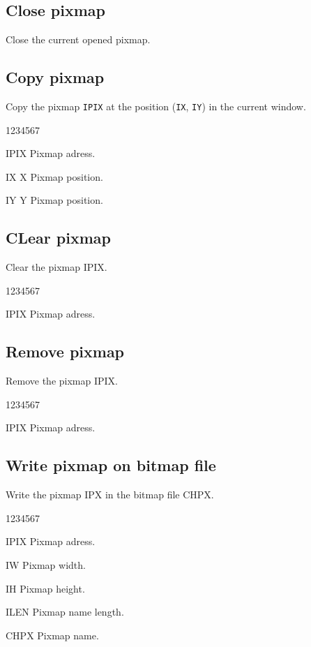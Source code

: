 \subsection{Close pixmap}
%
\Action
Close the current opened pixmap.

\subsection{Copy pixmap}
%
\Action
Copy the pixmap {\tt IPIX} at the position ({\tt IX}, {\tt IY}) in the
current window.
\begin{DLtt}{1234567}
\item[IPIX] Pixmap adress.
\item[IX] X Pixmap position.
\item[IY] Y Pixmap position.
\end{DLtt}

\subsection{CLear pixmap}
%
\Action
Clear the pixmap IPIX.
\begin{DLtt}{1234567}
\item[IPIX] Pixmap adress.
\end{DLtt}

\subsection{Remove pixmap}
%
\Action
Remove the pixmap IPIX.
\begin{DLtt}{1234567}
\item[IPIX] Pixmap adress.
\end{DLtt}

\subsection{Write pixmap on bitmap file}
%
\Action
Write the pixmap IPX in the bitmap file CHPX.
\begin{DLtt}{1234567}
\item[IPIX] Pixmap adress.
\item[IW] Pixmap width.
\item[IH] Pixmap height.
\item[ILEN] Pixmap name length.
\item[CHPX] Pixmap name.
\end{DLtt}

